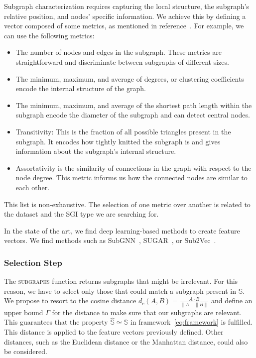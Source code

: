 \documentclass{llncs}
\begin{document}
Subgraph characterization requires capturing the local structure, the subgraph's relative position, and nodes' specific information.
We achieve this by defining a vector composed of some metrics, as mentioned in reference~\cite{Li2012}.
For example, we can use the following metrics:
\begin{itemize}
\item The number of nodes and edges in the subgraph.
These metrics are straightforward and discriminate between subgraphs of different sizes.
\item The minimum, maximum, and average of degrees, or clustering coefficients encode the internal structure of the graph.
\item The minimum, maximum, and average of the shortest path length within the subgraph encode the diameter of the subgraph and can detect central nodes.
\item Transitivity: This is the fraction of all possible triangles present in the subgraph.
It encodes how tightly knitted the subgraph is and gives information about the subgraph's internal structure.
\item Assortativity is the similarity of connections in the graph with respect to the node degree.
This metric informs us how the connected nodes are similar to each other.
\end{itemize}

This list is non-exhaustive.
The selection of one metric over another is related to the dataset and the SGI type we are searching for.

In the state of the art, we find deep learning-based methods to create feature vectors.
We find methods such as SubGNN~\cite{Alsentzer2020}, SUGAR~\cite{Sun2021}, or Sub2Vec~\cite{Adhikari2018}.

\subsubsection{Selection Step}\label{sec:selection}
The \textsc{subgraphs} function returns subgraphs that might be irrelevant.
For this reason, we have to select only those that could match a subgraph present in \(\mathbb{S}\).
We propose to resort to the cosine distance \(d_{c}(A, B) = \frac{A \cdot B}{\lVert A \rVert\lVert B \rVert}\) and define an upper bound \(\Gamma\) for the distance to make sure that our subgraphs are relevant.
This guarantees that the property \(\hat{\mathbb{S}} \simeq \mathbb{S}\) in framework~\eqref{eq:framework} is fulfilled.
This distance is applied to the feature vectors previously defined.
Other distances, such as the Euclidean distance or the Manhattan distance, could also be considered.
\end{document}
